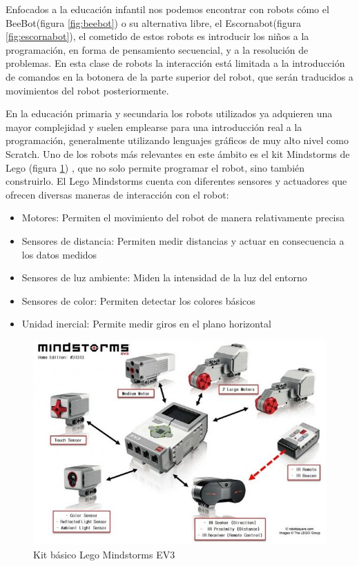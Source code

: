  Enfocados a la educación infantil nos podemos encontrar con robots cómo el BeeBot(figura \ref{fig:beebot}) o su alternativa libre, el Escornabot(figura \ref{fig:escornabot}), el cometido de estos robots es introducir los niños a la programación, en forma de pensamiento secuencial, y a la resolución de problemas. En esta clase de robots la interacción está limitada a la introducción de comandos en la botonera de la parte superior del robot, que serán traducidos a movimientos del robot posteriormente.  

 En la educación primaria y secundaria los robots utilizados ya adquieren una mayor complejidad y suelen emplearse para una introducción real a la programación, generalmente utilizando lenguajes gráficos de muy alto nivel como Scratch\cite{scratch}. Uno de los robots más relevantes en este ámbito es el kit Mindstorms de Lego (figura \ref{fig:legoev3}) , que no solo permite programar el robot, sino también construirlo. El Lego Mindstorms cuenta con diferentes sensores y actuadores que ofrecen diversas maneras de interacción con el robot:
 \begin{itemize}
 	\item Motores: Permiten el movimiento del robot de manera relativamente precisa
 	\item Sensores de distancia: Permiten medir distancias y actuar en consecuencia a los datos medidos
 	\item Sensores de luz ambiente: Miden la intensidad de la luz del entorno
 	\item Sensores de color: Permiten detectar los colores básicos
 	\item Unidad inercial: Permite medir giros en el plano horizontal
 \end{itemize}
 
   \begin{figure}
	\centering
	\includegraphics[width=0.8\linewidth]{imagenes/legoev3.jpg}
	\caption{Kit básico Lego Mindstorms EV3}
	\label{fig:legoev3}
\end{figure} 

